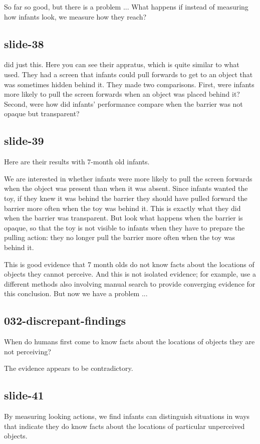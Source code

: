 \documentclass[12pt,\papersize]{extarticle}
\begin{document}
So far so good, but there is a problem ...
What happens if instead of measuring how infants look, we measure how they reach?

\subsection{slide-38}
\citet{Shinskey:2001fk} did just this.
Here you can see their appratus, which is quite similar to what \citet{baillargeon:1987_object}
used.
They had a screen that infants could pull forwards to get to an object that was sometimes
hidden behind it.
They made two comparisons.
First, were infants more likely to pull the screen forwards when an object was placed behind it?
Second, were how did infants' performance compare when the barrier was not opaque but transparent?

\subsection{slide-39}
Here are their results with 7-month old infants.

We are interested in whether infants were more likely to pull the screen forwards when the
object was present than when it was absent.
Since infants wanted the toy, if they knew it was behind the barrier they should have pulled
forward the barrier more often when the toy was behind it.
This is exactly what they did when the barrier was transparent.
But look what happens when the barrier is opaque, so that the toy is not visible to infants
when they have to prepare the pulling action: they no longer pull the barrier more often
when the toy was behind it.

This is good evidence that 7 month olds do not know facts about the locations of objects
they cannot perceive.
And this is not isolated evidence; for example, \citet{moore:2008_factors} use a different
methods also involving manual search to provide converging evidence for this conclusion.
But now we have a problem ...

\subsection{032-discrepant-findings}
When do humans first come to know facts about the locations of objects they are not perceiving?

The evidence appears to be contradictory.

\subsection{slide-41}
By measuring looking actions, we find infants can distinguish situations in ways that indicate
they do know facts about the locations of particular unperceived objects.
\end{document}
